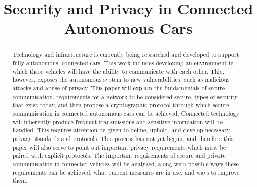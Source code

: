 \documentclass[conference,compsoc]{IEEEtran}
\begin{document}
\IEEEoverridecommandlockouts
{} 

\title{Security and Privacy in Connected Autonomous Cars}

\author{
\and
{}
}
\thispagestyle{plain}
\pagestyle{plain}

\maketitle


\begin{abstract}
Technology and infrastructure is currently being researched and developed to support fully autonomous, connected cars. This work includes developing an environment in which these vehicles will have the ability to communicate with each other. This, however, exposes the autonomous system to new vulnerabilities, such as malicious attacks and abuse of privacy. This paper will explain the fundamentals of secure communication, requirements for a network to be considered secure, types of security that exist today, and then propose a cryptographic protocol through which secure communication in connected autonomous cars can be achieved. Connected technology will inherently produce frequent transmissions and sensitive information will be handled. This requires attention be given to define, uphold, and develop necessary privacy standards and protocols. This process has not yet begun, and therefore this paper will also serve to point out important privacy requirements which must be paired with explicit protocols. The important requirements of secure and private communication in connected vehicles will be analyzed, along with possible ways these requirements can be achieved, what current measures are in use, and ways to improve them.  
\end{abstract}
\end{document}
